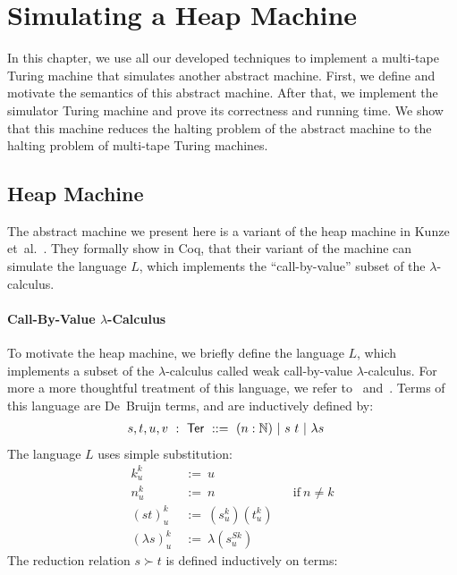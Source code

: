 \chapter{Simulating a Heap Machine}
\label{chap:heap}

\newcommand{\subst}[3]{{#1}^{#2}_{#3}}
\newcommand{\Ter}{\MS{Ter}}
\newcommand{\red}{\succ}


In this chapter, we use all our developed techniques to implement a multi-tape Turing machine that simulates another abstract machine.  First, we
define and motivate the semantics of this abstract machine.  After that, we implement the simulator Turing machine and prove its correctness and
running time.  We show that this machine reduces the halting problem of the abstract machine to the halting problem of multi-tape Turing machines.

\section{Heap Machine}
\label{sec:heap}

The abstract machine we present here is a variant of the heap machine in Kunze et~al.~\cite{KunzeEtAl:2018:Formal}.  They formally show in Coq, that
their variant of the machine can simulate the language $L$, which implements the ``call-by-value'' subset of the $\lambda$-calculus.

\subsubsection{Call-By-Value $\lambda$-Calculus}
\label{sec:L}

To motivate the heap machine, we briefly define the language $L$, which implements a subset of the $\lambda$-calculus called weak call-by-value
$\lambda$-calculus.  For more a more thoughtful treatment of this language, we refer to~\cite{forster2017weak} and~\cite{KunzeEtAl:2018:Formal}.
Terms of this language are De~Bruijn terms, and are inductively defined by:
\begin{align*}
  s,t,u,v &~:~\Ter~::=~ (n:\Nat) ~|~ s~t ~|~ \lambda s
\end{align*}
The language $L$ uses simple substitution:
\begin{align*}
  \subst kku &~:=~u \\
  \subst nku &~:=~n &&\text{if}~n\neq k \\
  \subst{(st)}ku &~:=~(\subst sku)(\subst tku) \\
  \subst{(\lambda s)}ku &~:=~\lambda(\subst s{Sk}u)
\end{align*}
The reduction relation $s \red t$ is defined inductively on terms:


